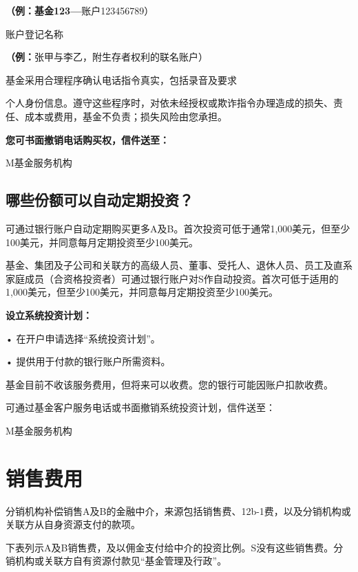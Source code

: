\documentclass[UTF8,fontset=none,11pt,a4paper]{ctexart}
\begin{document}
\textbf{（例：基金123—}账户123456789）

账户\allowbreak\mbox{登记名称}

\textbf{（例：}张甲与李乙，附生存者权利的\allowbreak\mbox{联名账户）}

基金采用合理程序确认电话指令真实，包括录\allowbreak\mbox{音及要求}

个人身份信息。遵守这些程序时，对依未经授权或欺诈指令办理造成的损失、责任、成本或费用，基金不负责；损失风险\allowbreak\mbox{由您承担。}

\textbf{您可书面撤销电话购买权，信件送至：}

\noindent M基金\allowbreak\mbox{服务机构}\par\smallskip
\subsection*{哪些份额可以自动定期投资？}
可通过银行账户自动定期购买更多A及B。首次投资可低于通常1,000美元，但至少100美元，并同意每月定期投资至少100美元。

基金、集团及子公司和关联方的高级人员、董事、受托人、退休人员、员工及直系家庭成员（合资格投资者）可通过银行账户对S作自动投资。首次可低于适用的1,000美元，但至少100美元，并同意每月定期投资至少100美元。

\textbf{设立系统投资计划：}

\noindent • 在开户申请选择“系统\allowbreak\mbox{投资计划”。}\par\smallskip
\noindent • 提供用于付款的银行账户\allowbreak\mbox{所需资料。}\par\smallskip
基金目前不收该服务费用，但将来可以收费。您的银行可能因账户\allowbreak\mbox{扣款收费。}

可通过基金客户服务电话或书面撤销系统投资计划，信\allowbreak\mbox{件送至：}

\noindent M基金\allowbreak\mbox{服务机构}\par\smallskip

\par{}\label{originalpage13}
\section*{销售费用}\label{unitU475}
分销机构补偿销售A及B的金融中介，来源包括销售费、12b-1费，以及分销机构或关联方从自身资源支\allowbreak\mbox{付的款项。}

下表列示A及B销售费，及以佣金支付给中介的投资比例。S没有这些销售费。分销机构或关联方自有资源付款见“基金管\allowbreak\mbox{理及行政”。}
\end{document}
